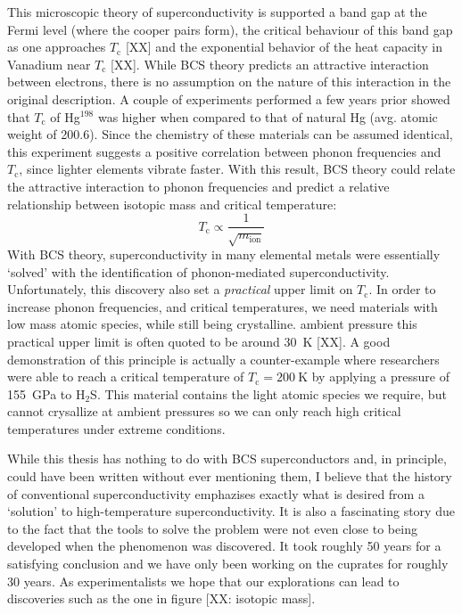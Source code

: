 This microscopic theory of superconductivity is supported a band gap at the Fermi level (where the cooper pairs form), the critical behaviour of this band gap as one approaches $T_\text{c}$ [XX] and the exponential behavior of the heat capacity in Vanadium near $T_\text{c}$ [XX]. While BCS theory predicts an attractive interaction between electrons, there is no assumption on the nature of this interaction in the original description. A couple of experiments performed a few years prior showed that $T_\text{c}$ of Hg$^{198}$ was higher when compared to that of natural Hg (avg. atomic weight of 200.6). Since the chemistry of these materials can be assumed identical, this experiment suggests a positive correlation between phonon frequencies and $T_\text{c}$, since lighter elements vibrate faster. With this result, BCS theory could relate the attractive interaction to phonon frequencies and predict a relative relationship between isotopic mass and critical temperature:
%
\[ T_\text{c} \propto \frac{1}{\sqrt{m_\text{ion}}} \]
%
With BCS theory, superconductivity in many elemental metals were essentially `solved' with the identification of phonon-mediated superconductivity. Unfortunately, this discovery also set a \emph{practical} upper limit on $T_\text{c}$. In order to increase phonon frequencies, and critical temperatures, we need materials with low mass atomic species, while still being crystalline. ambient pressure this practical upper limit is often quoted to be around \SI{30}{\kelvin} [XX]. A good demonstration of this principle is actually a counter-example where researchers were able to reach a critical temperature of $T_\text{c} = \SI{200}{\kelvin}$ by applying a pressure of \SI{155}{\giga\pascal} to H$_2$S. This material contains the light atomic species we require, but cannot crysallize at ambient pressures so we can only reach high critical temperatures under extreme conditions.

While this thesis has nothing to do with BCS superconductors and, in principle, could have been written without ever mentioning them, I believe that the history of conventional superconductivity emphazises exactly what is desired from a `solution' to high-temperature superconductivity. It is also a fascinating story due to the fact that the tools to solve the problem were not even close to being developed when the phenomenon was discovered. It took roughly 50 years for a satisfying conclusion and we have only been working on the cuprates for roughly 30 years. As experimentalists we hope that our explorations can lead to discoveries such as the one in figure [XX: isotopic mass]. 

